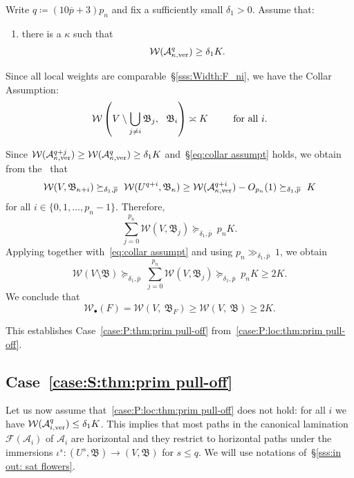 \documentclass{amsart}
\newcommand{\bush}{{\mathfrak B }}
\newcommand{\bbush}{{\boldsymbol {\mathfrak B} }}
\renewcommand{\sp}{{\ \ }}
\newcommand{\1}{{\mathbb 1 }}
\newcommand{\Fam}{{\mathcal F}}
\newcommand{\Width}{{\mathcal W}}
\renewcommand{\AA}{{\mathcal A}}
\begin{document}
Write $q\coloneqq  (10 \overline p +3 )p_n$ and fix a sufficiently small $\delta_1>0$. Assume that:
\begin{enumerate}[label=\text{(P${}_\loc$)},font=\normalfont,leftmargin=*]
\item \label{case:P:loc:thm:prim pull-off} there is a $\kappa$ such that
\[\Width(\AA_{\kappa,\ver}^{ q})\ge \delta_1 K.\]
\end{enumerate}

Since all local weights are comparable~\S\ref{sss:Width:F_ni}, we have the Collar Assumption:
\begin{equation}
\label{eq:collar assumpt}
\Width\left(V\setminus \bigcup_{j\not=i}\bush_j, \sp \bush_i \right)\asymp K\hspace{0.8cm} \text{ for all $i$.}
\end{equation}

Since $\Width(\AA_{\kappa,\ver}^{ q+j})\ge  \Width(\AA_{\kappa,\ver}^{ q}) \ge \delta_1 K$ and~\S\ref{eq:collar assumpt} holds, we obtain from the~\cite[Covering Lemma]{covering lemma} that
\[\Width(V, \bush_{\kappa+i})\succeq_{\delta_1, \overline p} \ \Width(U^{q+i}, \bush_{\kappa}) \ge \Width(\AA_{\kappa,\ver}^{ q+i}) -O_{p_n}(1) \succeq_{\delta_1, \overline p}\ K\]
for all $i\in \{0,1, \dots, p_n-1\}$. Therefore,
\[\sum_{j=0}^{p_{n}}\Width(V, \bush_{j})\succeq_{\delta_1, \overline p}\  p_n K.\]
Applying \cite[Quasi Additivity Law with separation]{covering lemma} together with~\eqref{eq:collar assumpt} and using $p_n\gg _{\delta_1,\overline p}\ 1$, we obtain
\[\Width(V\setminus \bbush)\succeq_{\delta_1,\overline p }\ \sum_{j=0}^{p_{n}}\Width(V, \bush_{j})\succeq_{\delta_1, \overline p}\   p_n K\ge 2K.\]
We conclude that
\[ \Width_\bullet(F) = \Width( V,\  \bush_F)\ge \Width( V,\ \bbush) \ge 2K.\]

This establishes Case~\ref{case:P:thm:prim pull-off} from~\ref{case:P:loc:thm:prim pull-off}. 


\subsection{Case~\ref{case:S:thm:prim pull-off}} 
\label{prf:P:thm:prim pull-off}
Let us now assume that~\ref{case:P:loc:thm:prim pull-off} does not hold: for all $i$ we have $\Width(\AA_{i,\ver}^{q})\le \delta_1 K$. This implies that most paths in the canonical lamination $\Fam (\AA_{i})$ of $\AA_i$ are horizontal and they restrict to horizontal paths under the immersions $\iota^s\colon (U^s,\bbush)\to (V,\bbush)$ for $s\le q$. We will use notations of~\S\ref{sss:in out: sat flowers}.
\end{document}
